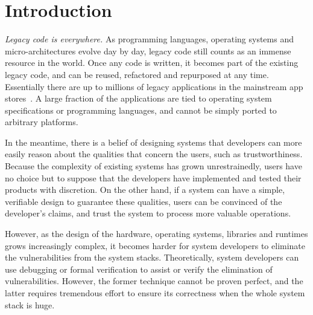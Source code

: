 \chapter{Introduction}
\label{chap:intro}


\emph{Legacy code is everywhere.}
As programming languages, operating systems and micro-architectures
evolve day by day,
legacy code still counts as an immense resource in the world.
Once any code is written,
it becomes part of the existing legacy code,
and can be
reused, refactored and repurposed at any time.
Essentially there are up to millions of legacy applications
in the mainstream app stores~\citep{google-play, apple-store, ubuntu-packages}.
A large fraction of the applications are tied to
operating system specifications or programming languages,
and cannot be simply ported to arbitrary platforms.

In the meantime, there is a belief of designing systems
that developers can more easily
reason about the qualities that concern the users,
such as trustworthiness.
Because the complexity of existing systems has grown unrestrainedly,
users have no choice but to suppose that the developers
have implemented and tested their products with discretion.
On the other hand, if a system
can have a simple, verifiable design to guarantee these qualities,
users can be convinced of the developer's claims,
and trust the system to process more valuable operations.








However, as the design of the hardware, operating systems, libraries and runtimes grows increasingly complex,
it becomes harder for system developers to eliminate the vulnerabilities
from the system stacks.
Theoretically, system developers can use debugging or formal verification
to assist or verify the elimination of vulnerabilities.
However, the former technique cannot be proven perfect, and the latter requires tremendous effort to ensure its correctness
when the whole system stack is huge.

